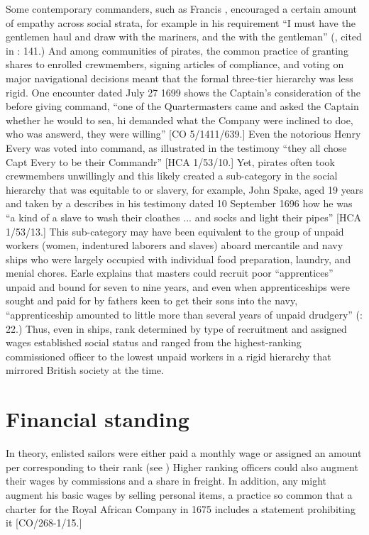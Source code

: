 Some contemporary commanders, such as Francis , encouraged a certain amount of empathy across social strata, for example in his requirement “I must have the gentlemen haul and draw with the mariners, and the  with the gentleman” (, cited in \citealt{Bicheno2012}: 141.) And among communities of pirates, the common practice of granting shares to enrolled crewmembers, signing articles of compliance, and voting on major navigational decisions meant that the formal three-tier hierarchy was less rigid. One  encounter dated July 27 1699 shows the Captain’s consideration of the  before giving command, “one of the Quartermasters came and asked the Captain whether he would to sea, hi demanded what the Company were inclined to doe, who was answerd, they were willing” [CO 5/1411/639.] Even the notorious  Henry Every was voted into command, as illustrated in the testimony “they all chose Capt Every to be their Commandr” [HCA 1/53/10.] Yet, pirates often took crewmembers unwillingly and this likely created a sub-category in the social hierarchy that was equitable to  or slavery, for example, John Spake, aged 19 years and taken by a  describes in his testimony dated 10 September {1696} how he was “a kind of a slave to wash their cloathes ... and socks and light their pipes” [HCA 1/53/13.] This sub-category may have been equivalent to the group of unpaid workers (women, indentured laborers and slaves) aboard mercantile and navy ships who were largely occupied with individual food preparation, laundry, and menial chores.  Earle explains that masters could recruit poor “apprentices” unpaid and bound for seven to nine years, and even when apprenticeships were sought and paid for by fathers keen to get their sons into the navy, “apprenticeship amounted to little more than several years of unpaid drudgery” (\citealt{Earle1998}: 22.) Thus, even in  ships, rank determined by type of recruitment and assigned wages established social status and ranged from the highest-ranking commissioned officer to the lowest unpaid workers in a rigid hierarchy that mirrored British society at the time. 

\section{{Financial standing}}\label{sec:3.8}

In theory, enlisted sailors were either paid a monthly wage or assigned an amount per  corresponding to their rank (see ) Higher ranking officers could also augment their wages by commissions and a share in freight. In addition, any  might augment his basic wages by selling personal items, a practice so common that a charter for the Royal African Company in 1675 includes a statement prohibiting it [CO/268-1/15.]  

